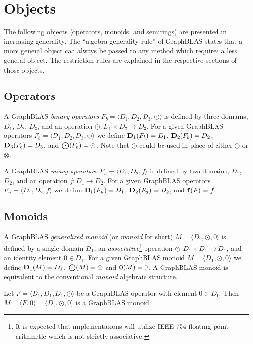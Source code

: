 \chapter{Objects}

The following objects (operators, monoids, and semirings) are presented in increasing generality.
The ``algebra generality rule'' of GraphBLAS states that a more general object can always be passed to
any method which requires a less general object. The restriction rules are explained in the respective sections of those objects.

\section{Operators}

A GraphBLAS \emph{binary operators} $F_b = \langle D_1, D_2, D_3, \odot \rangle$
is defined by three domains, $D_1$, $D_2$, $D_3$, and an operation
$\odot: D_1 \times D_2 \rightarrow D_3$.  For a given GraphBLAS operators
$F_b=\langle D_1, D_2, D_3,\odot \rangle$ we define $\bold{D}_1(F_b) = D_1$,
$\bold{D}_2(F_b) = D_2$, $\bold{D}_3(F_b) = D_3$, and $\bold{\bigodot}(F_b)
= \odot$.  Note that $\odot$ could be used in place of either $\oplus$ or $\otimes$.

A GraphBLAS \emph{unary operators} $F_u = \langle D_1, D_2, f\rangle$
is defined by two domains, $D_1$, $D_2$, and an operation
$f: D_1 \rightarrow D_2$.  For a given GraphBLAS operators
$F_u=\langle D_1, D_2, f \rangle$ we define $\bold{D}_1(F_u) = D_1$,
$\bold{D}_2(F_u) = D_2$, and $\bold{f}(F)
= f$.

\section{Monoids}

A GraphBLAS \emph{generalized monoid} (or \emph{monoid} for short) $M =
\langle D_1,\odot,0 \rangle$ is defined by a single domain $D_1$, an 
\emph{associative}\footnote{It is expected that implementations 
will utilize IEEE-754 floating point arithmetic which is not 
strictly associative.} 
operation $\odot: D_1 \times D_1 \rightarrow D_1$,
and an identity element $0 \in D_1$.  For a given GraphBLAS monoid $M=\langle
D_1,\odot,0 \rangle$ we define $\bold{D}_1(M) = D_1$, $\bold{\bigodot}(M) =
\odot$ and $\bold{0}(M) = 0$.  A GraphBLAS monoid is equivalent to 
the conventional \emph{monoid} algebraic structure.

Let $F = \langle D_1,D_1,D_1,\odot \rangle$ be a GraphBLAS operator
with element $0 \in D_1$.  Then $M = \langle F,0 \rangle = \langle
D_1,\odot,0 \rangle$ is a GraphBLAS monoid.

